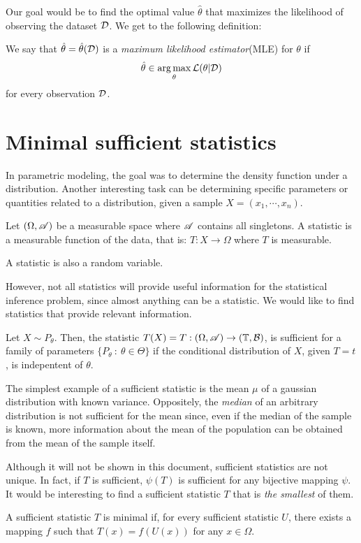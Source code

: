 Our goal would be to find the optimal value $\hat{\theta}$ that maximizes the likelihood of observing the dataset $\mathcal{D}$. We get to the following definition:

\begin{ndef}
    We say that $\hat{\theta} = \hat\theta (\mathcal{D})$ is a \emph{maximum likelihood estimator}(MLE) for $\theta$ if  
    $$
    \hat\theta \in \operatorname*{arg\,max}_{\theta} \mathcal L(\theta | \mathcal{D})
    $$
    for every observation $\mathcal{D}$. 
\end{ndef}

\section{Minimal sufficient statistics}

In parametric modeling, the goal was to determine the density function under a distribution. Another interesting task can be determining specific parameters or quantities related to a distribution, given a sample $X = (x_1,\cdots,x_n)$.

\begin{ndef}
    Let $(\Omega,\mathscr{A})$ be a measurable space where $\mathscr{A}$ contains all singletons. A statistic is a measurable function of the data, that is: $T: X \to \Omega$ where $T$ is measurable.
\end{ndef}
\begin{remark}
    A statistic is also a random variable.
\end{remark}

However, not all statistics will provide useful information for the statistical inference problem, since almost anything can be a statistic. We would like to find statistics that provide relevant information.

\begin{ndef}
    Let $X \sim P_\theta$. Then, the statistic $T(X) = T : (\Omega, \mathscr{A}) \to (\mathbb T, \mathcal B)$, is sufficient for a family of parameters $\{P_\theta \ : \ \theta \in \Theta \}$ if the conditional distribution of $X$, given $T = t$, is indepentent of $\theta$.\\
\end{ndef}

\begin{nexample}
The simplest example of a sufficient statistic is the mean $\mu$ of a gaussian distribution with known variance. Oppositely, the \emph{median} of an arbitrary distribution
is not sufficient for the mean since, even if the median of the sample is known, more information about the mean of the population can be obtained from the mean of the sample itself.
\end{nexample}

Although it will not be shown in this document, sufficient statistics are not unique. In fact, if $T$ is sufficient, $\psi(T)$ is sufficient for any bijective mapping $\psi$. It would be interesting to find a sufficient statistic $T$ that is \emph{the smallest} of them.

\begin{ndef}
    A sufficient statistic $T$ is minimal if, for every sufficient statistic $U$, there exists a mapping $f$ such that $T(x) = f(U(x))$ for any $x \in \Omega$.
\end{ndef}